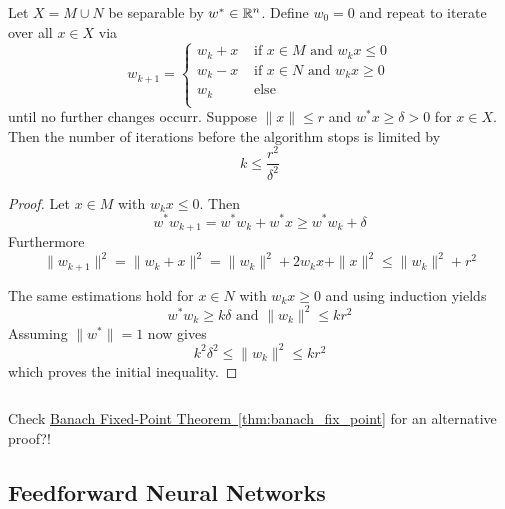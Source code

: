 \begin{theorem}\label{thm:perceptron_convergence}
    Let \( X = M \cup N \) be separable by \( w^*\in \mathbb{R}^n \). Define \( w_0 = 0 \)
    and repeat to iterate over all \( x \in X \) via
    \[
        w_{k + 1} = \left \{
        \begin{array}{ll}
            w_k + x & \text{ if } x \in M \text{ and } w_k x \le 0 \\
            w_k - x & \text{ if } x \in N \text{ and } w_k x \ge 0 \\
            w_k     & \text{ else }                                \\
        \end{array}
        \right.
    \]
    until no further changes occurr. Suppose \( \|x\| \le r \)  and \( w^*x \ge \delta > 0 \) 
    for \( x \in X \). Then the number of iterations before the algorithm stops is limited by
    \[
        k\le \frac{r^2}{\delta^2}
    \]
\end{theorem}

\begin{proof}
    Let \( x \in M \) with \( w_k x \le 0 \). Then
    \[
        w^*w_{k + 1} = w^*w_k + w^*x \ge w^*w_k + \delta
    \]
    Furthermore
    \[
        \|w_{k + 1}\|^2 = \|w_k + x\|^2 = \|w_k\|^2 + 2w_k x + \|x\|^2 \le \|w_k\|^2 + r^2
    \]

    The same estimations hold for \( x \in N \) with \( w_k x \ge 0 \) and using induction yields
    \[
        w^*w_k \ge k\delta \text{ and } \|w_k\|^2 \le kr^2
    \]
    Assuming \( \|w^*\| = 1\) now gives
    \[
        k^2\delta^2 \le \|w_k\|^2 \le kr^2
    \]
    which proves the initial inequality.
\end{proof}
\bigskip


\begin{algorithm}[Perceptron]\label{algo:perceptron}
\end{algorithm}
\inputminted[fontsize=\small, framesep=0.35cm, frame=lines, python3=true]{python}{python/perceptron.py}
\bigskip


\begin{remark}
    Check \hyperref[thm:banach_fix_point]{Banach Fixed-Point Theorem~\ref*{thm:banach_fix_point}} 
    for an alternative proof?!
\end{remark}
\bigskip


\subsection{Feedforward Neural Networks}

